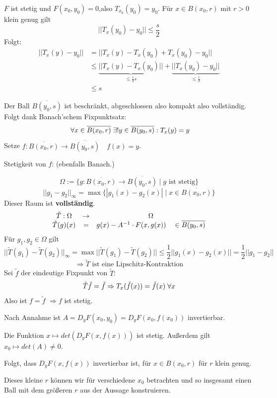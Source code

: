 \documentclass[main.tex]{subfiles}
\begin{document}
\begin{Beweis}
\begin{Beweis}
    $F$ ist stetig und $F(x_0,y_0) = 0$,also $T_{x_0}(y_0) = y_0$. Für $x \in B(x_0,r)$ mit $r>0$ klein genug gilt
    $$||T_x(y_0) - y_0|| \leq \dfrac{s}{2}$$
    Folgt:
    $$\begin{aligned}
      ||T_x(y) - y_0|| & = ||T_x(y) - T_x(y_0) + T_x(y_0) -y_0|| \\
      & \leq \underbrace{||T_x(y) - T_x(y_0)||}_{\leq \frac{1}{2}s} + \underbrace{|| T_x(y_0) -y_0||}_{\leq \frac{1}{2}} \\
      & \leq s
    \end{aligned}$$
  \end{Beweis}
  Der Ball $\overline{B(y_0,s)}$ ist beschränkt, abgeschlossen also kompakt also vollständig. Folgt dank Banach'schem Fixpunktsatz:
  $$\;\forall x \in \overline{B(x_0,r)} \;\exists! y \in \overline{B(y_0,s)} : T_x(y) = y$$
  Setze $f:\overline{B(x_0,r)} \to \overline{B(y_0,s)} \quad f(x) = y$.

  Stetigkeit von $f$: (ebenfalls Banach.)

  $$\Omega := \{g : \overline{B(x_0,r)} \to \overline{B(y_0,s)} \mid g \text{ ist stetig}\}$$
  $$||g_1 - g_2||_\infty = \max\{|g_1(x) - g_2(x)| \mid x \in \overline{B(x_0,r)}\}$$
  Dieser Raum ist \textbf{vollständig}.
  $$\begin{array}{c c c}
    \tilde{T}: \Omega & \to & \Omega \\
    \tilde{T}(g)(x) & = & g(x) - A^{-1} \cdot F(x,g(x)) \quad \in \overline{B(y_0,s)}
  \end{array}$$
  Für $g_1,g_2 \in \Omega$ gilt
  $$||\tilde{T}(g_1) - \tilde{T}(g_2)||_\infty = \max ||\tilde{T}(g_1) - \tilde{T}(g_2)|| \leq \dfrac{1}{2} ||g_1(x) - g_2(x)|| = \dfrac{1}{2} ||g_1 - g_2||$$
  $$\Rightarrow \tilde{T} \text{ ist eine Lipschitz-Kontraktion}$$
  Sei $\tilde{f}$ der eindeutige Fixpunkt von $\tilde{T}$:
  $$\tilde{T}\tilde{f} = \tilde{f} \Rightarrow T_x(\tilde{f}(x)) = \tilde{f}(x) \;\forall x$$
  Also ist $f = \tilde{f}$ $\Rightarrow f$ ist stetig.
\end{Beweis}

\begin{Beweis}
  Nach Annahme ist $A = D_y F(x_0,y_0) = D_y F(x_0,f(x_0))$ invertierbar.

  Die Funktion $x \mapsto det(D_y F(x,f(x)))$ ist stetig. Außerdem gilt $x_0 \mapsto det(A) \neq 0$.

  Folgt, dass $D_y F(x,f(x))$ invertierbar ist, für $x \in B(x_0,r)$ für $r$ klein genug.

  Dieses kleine $r$ können wir für verschiedene $x_0$ betrachten und so insgesamt einen Ball mit dem größeren $r$ aus der Aussage konstruieren.
\end{Beweis}
\end{document}
